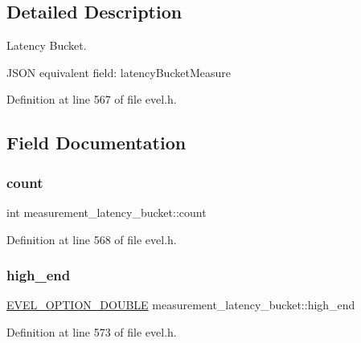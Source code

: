 \subsection{Detailed Description}
Latency Bucket. 

J\+S\+ON equivalent field\+: latency\+Bucket\+Measure 

Definition at line 567 of file evel.\+h.



\subsection{Field Documentation}
\hypertarget{structmeasurement__latency__bucket_a5957e2d644bce4e4403ce381aca6bc93}{}\label{structmeasurement__latency__bucket_a5957e2d644bce4e4403ce381aca6bc93} 
\subsubsection{\texorpdfstring{count}{count}}
{\footnotesize\ttfamily int measurement\+\_\+latency\+\_\+bucket\+::count}



Definition at line 568 of file evel.\+h.

\hypertarget{structmeasurement__latency__bucket_a0262bdf5074643c3f1d2ed3d1c6a3342}{}\label{structmeasurement__latency__bucket_a0262bdf5074643c3f1d2ed3d1c6a3342} 
\subsubsection{\texorpdfstring{high\+\_\+end}{high\_end}}
{\footnotesize\ttfamily \hyperlink{evel_8h_aafc42b3cd9aca88804c3d413e4ccec06}{E\+V\+E\+L\+\_\+\+O\+P\+T\+I\+O\+N\+\_\+\+D\+O\+U\+B\+LE} measurement\+\_\+latency\+\_\+bucket\+::high\+\_\+end}



Definition at line 573 of file evel.\+h.

\hypertarget{structmeasurement__latency__bucket_a91976b4df5f1d47211bb73a54e7a2d91}{}\label{structmeasurement__latency__bucket_a91976b4df5f1d47211bb73a54e7a2d91} 
